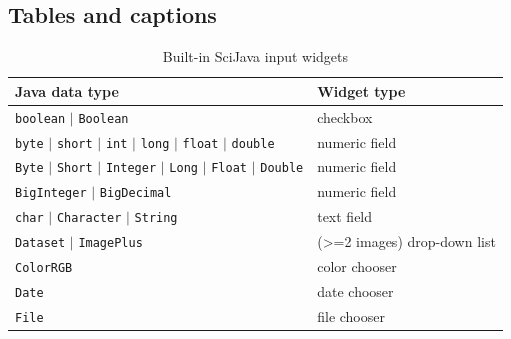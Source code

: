 \documentclass{bmcart}
\begin{document}
\begin{backmatter}
\subsection*{Tables and captions}
  \renewcommand\thetable{S.\arabic{table}}
  \setcounter{table}{0}

  \begin{table}[h!]
    \caption{Built-in SciJava input widgets}
    \begin{tabular}{| l | l |}
      \hline
      \textbf{Java data type}                                                                                                            & \textbf{Widget type}                   \\ \hline
      \texttt{boolean} $\vert$ \texttt{Boolean}                                                                                          & checkbox                               \\ \hline
      \texttt{byte} $\vert$ \texttt{short} $\vert$ \texttt{int}     $\vert$ \texttt{long} $\vert$ \texttt{float} $\vert$ \texttt{double} & numeric field                          \\ \hline
      \texttt{Byte} $\vert$ \texttt{Short} $\vert$ \texttt{Integer} $\vert$ \texttt{Long} $\vert$ \texttt{Float} $\vert$ \texttt{Double} & numeric field                          \\ \hline
      \texttt{BigInteger} $\vert$ \texttt{BigDecimal}                                                                                    & numeric field                          \\ \hline
      \texttt{char} $\vert$ \texttt{Character} $\vert$ \texttt{String}                                                                   & text field                             \\ \hline
      \texttt{Dataset} $\vert$ \texttt{ImagePlus}                                                                                        & (\textgreater=2 images) drop-down list \\ \hline
      \texttt{ColorRGB}                                                                                                                  & color chooser                          \\ \hline
      \texttt{Date}                                                                                                                      & date chooser                           \\ \hline
      \texttt{File}                                                                                                                      & file chooser                           \\ \hline
    \end{tabular}
  \end{table}


\end{backmatter}
\end{document}
